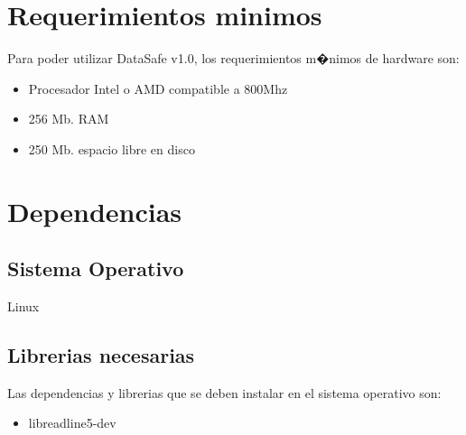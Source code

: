 \documentclass[12pt]{article}
\numberwithin{equation}{section}
\numberwithin{figure}{section}
\numberwithin{table}{section}
\begin{document}
%
%
\pagestyle{fancy}
\renewcommand{\sectionmark}[1]{\markboth{}{\thesection\ \ #1}}
\lhead{}
\chead{}
\rhead{\rightmark}
\lfoot{}
\cfoot{}
\rfoot{\thepage}

\maketitle

%
%
\tableofcontents
\newpage

%
%
\section{Requerimientos minimos}
Para poder utilizar DataSafe v1.0, los requerimientos m�nimos de hardware son:

\begin{itemize}
 \item Procesador Intel o AMD compatible a 800Mhz
\end{itemize}

\begin{itemize}
 \item 256 Mb. RAM
\end{itemize}

\begin{itemize}
 \item 250 Mb. espacio libre en disco
\end{itemize}

\section{Dependencias}

\subsection{Sistema Operativo}
Linux

\subsection{Librerias necesarias}
Las dependencias y librerias que se deben instalar en el sistema operativo son:

\begin{itemize}
 \item libreadline5-dev
\end{itemize}
\end{document}
